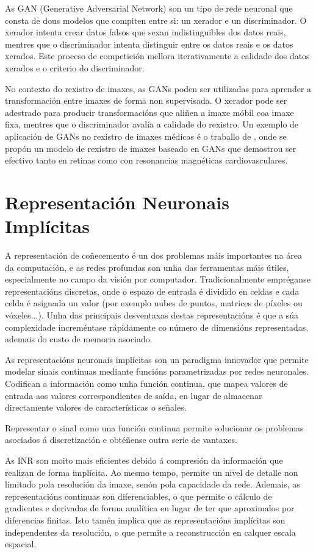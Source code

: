 As \gls{GAN} (Generative Adversarial Network) son un tipo de rede neuronal que consta de dous modelos que compiten entre si: un xerador e un discriminador. O xerador intenta crear datos falsos que sexan indistinguibles dos datos reais, mentres que o discriminador intenta distinguir entre os datos reais e os datos xerados. Este proceso de competición mellora iterativamente a calidade dos datos xerados e o criterio do discriminador.

No contexto do rexistro de imaxes, as GANs poden ser utilizadas para aprender a transformación entre imaxes de forma non supervisada. O xerador pode ser adestrado para producir transformacións que aliñen a imaxe móbil coa imaxe fixa, mentres que o discriminador avalía a calidade do rexistro.
Un exemplo de aplicación de GANs no rexistro de imaxes médicas é o traballo de \cite{mahapatra2019ganbasedmedicalimage}, onde se propón un modelo de rexistro de imaxes baseado en GANs que demostrou ser efectivo tanto en retinas como con resonancias magnéticas cardiovasculares.

\section{Representación Neuronais Implícitas}
\label{sec:Representación Neuronais Implícitas}

A representación de coñecemento é un dos problemas máis importantes na área da computación, e as 
redes profundas son unha das ferramentas máis útiles, especialmente no campo da visión por computador.
Tradicionalmente empréganse representacións discretas, onde o espazo de entrada é dividido en celdas e cada celda é asignada un valor (por exemplo nubes de puntos, matrices de píxeles ou vóxeles...).
Unha das principais desventaxas destas representacións é que a súa complexidade increméntase rápidamente co número de dimensións representadas, ademais do custo de memoria asociado.

 As representacións neuronais implícitas son un paradigma innovador que permite modelar sinais continuas mediante funcións parametrizadas por redes neuronales.
 Codifican a información como unha función continua, que mapea valores de entrada aos valores correspondientes de saída, en lugar de almacenar directamente valores de características o señales.

Representar o sinal como una función continua permite solucionar os problemas asociados á discretización e obtéñense outra serie de vantaxes.

As INR son moito mais eficientes debido á compresión da información que realizan de forma implícita. Ao mesmo tempo, permite un nivel de detalle non limitado pola resolución da imaxe, senón pola capacidade da rede. 
 Ademais, as representacións continuas son diferenciables, o que permite o cálculo de gradientes e derivadas de forma analítica en lugar de ter que aproximalos por diferencias finitas.
 Isto tamén implica que as representacións implícitas son independentes da resolución, o que permite a reconstrucción en calquer escala espacial.
 
